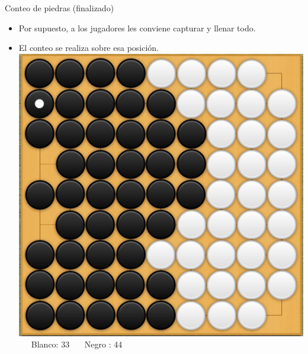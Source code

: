 \documentclass{beamer}
\begin{document}
\begin{frame}{Conteo de piedras (finalizado)}
  
  \begin{itemize}
    \item Por supuesto, a los jugadores les conviene capturar y llenar todo.
    \item El conteo se realiza sobre esa posición.
    \includegraphics[scale=0.17]{conteo-piedras.png} \ \ \ Blanco: 33 \ \ \ Negro : 44  
  \end{itemize}
  
\end{frame}
\end{document}
